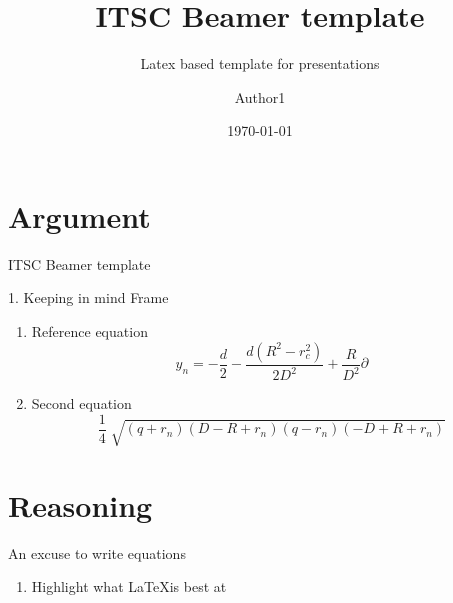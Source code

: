 \documentclass[aspectratio=169, 22pt]{beamer}
\title{ITSC Beamer template}
\subtitle{Latex based template for presentations}
\date{\today}
\author[Author]{Author1}
\begin{document}
\begin{frame}
  \titlepage{}
\end{frame}

\section{Argument}

\begin{frame}{ITSC Beamer template}
  \begin{block}{1. Keeping in mind}
    Frame
  \end{block}

  \begin{enumerate}
    \item<1-> Reference equation
      \begin{equation}
        y_n=-\frac{d}{2}-\frac{d(R^2 - r_c^2)}{2D^2}+\frac{R}{D^2}\partial
      \end{equation}
    \item<2-> Second equation
      \begin{equation}
        \frac{1}{4} \sqrt[]{(q+r_n)(D-R+r_n)(q-r_n)(-D+R+r_n)}
      \end{equation}
  \end{enumerate}
\end{frame}

\section{Reasoning}

\begin{frame}{An excuse to write equations}
  \begin{enumerate}
    \item Highlight what \LaTeX is best at
  \end{enumerate}
\end{frame}
\end{document}
